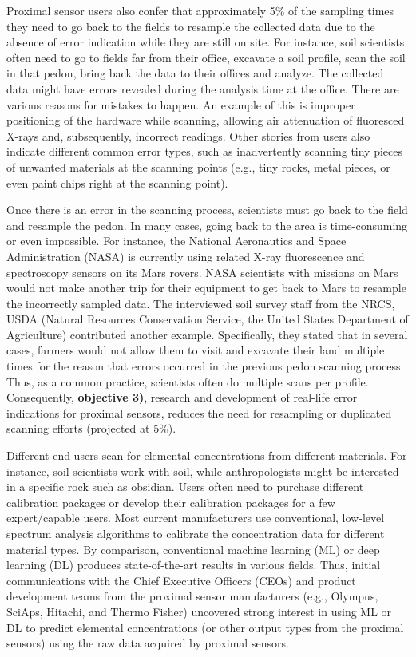 Proximal sensor users also confer that approximately 5\% of the sampling times they need to go back to the fields to resample the collected data due to the absence of error indication while they are still on site. For instance, soil scientists often need to go to fields far from their office, excavate a soil profile, scan the soil in that pedon, bring back the data to their offices and analyze. The collected data might have errors revealed during the analysis time at the office. There are various reasons for mistakes to happen. An example of this is improper positioning of the hardware while scanning, allowing air attenuation of fluoresced X-rays and, subsequently, incorrect readings. Other stories from users also indicate different common error types, such as inadvertently scanning tiny pieces of unwanted materials at the scanning points (e.g., tiny rocks, metal pieces, or even paint chips right at the scanning point). 


Once there is an error in the scanning process, scientists must go back to the field and resample the pedon. In many cases, going back to the area is time-consuming or even impossible. For instance, the National Aeronautics and Space Administration (NASA) is currently using related X-ray fluorescence and \visnir{} spectroscopy sensors on its Mars rovers. NASA scientists with missions on Mars would not make another trip for their equipment to get back to Mars to resample the incorrectly sampled data. The interviewed soil survey staff from the NRCS, USDA (Natural Resources Conservation Service, the United States Department of Agriculture) contributed another example. Specifically, they stated that in several cases, farmers would not allow them to visit and excavate their land multiple times for the reason that errors occurred in the previous pedon scanning process. Thus, as a common practice, scientists often do multiple scans per profile. Consequently, \textbf{objective 3)}, research and development of real-life error indications for proximal sensors, reduces the need for resampling or duplicated scanning efforts (projected at 5\%).


Different end-users scan for elemental concentrations from different materials. For instance, soil scientists work with soil, while anthropologists might be interested in a specific rock such as obsidian. Users often need to purchase different calibration packages or develop their calibration packages for a few expert/capable users. Most current manufacturers use conventional, low-level spectrum analysis algorithms to calibrate the concentration data for different material types. By comparison, conventional machine learning (ML) or deep learning (DL) produces state-of-the-art results in various fields. Thus, initial communications with the Chief Executive Officers (CEOs) and product development teams from the proximal sensor manufacturers (e.g., Olympus, SciAps, Hitachi, and Thermo Fisher) uncovered strong interest in using ML or DL to predict elemental concentrations (or other output types from the proximal sensors) using the raw data acquired by proximal sensors.


